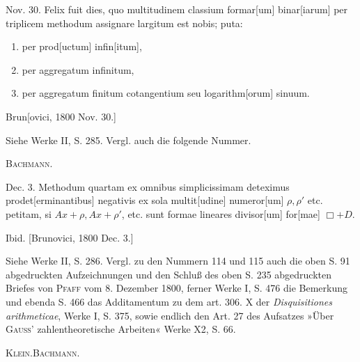 \noindent\hspace*{\parindent}Nov. 30. Felix fuit dies, quo multitudinem classium formar[um] binar[iarum] per triplicem methodum assignare largitum est nobis; puta:
\begin{enumerate}
\item per prod[uctum] infin[itum],
\item per aggregatum infinitum,
\item per aggregatum finitum cotangentium seu logarithm[orum] sinuum.
\end{enumerate}
\par\noindent\hfill Brun[ovici, 1800 Nov. 30.]
\par\medskip\begingroup\small
\noindent\hspace*{\parindent}Siehe Werke II, S. 285. Vergl. auch die folgende Nummer.
\par\noindent\hfill\textsc{Bachmann.}
\par\endgroup

\noindent\hspace*{\parindent}Dec. 3. Methodum quartam ex omnibus simplicissimam deteximus pro\linebreak det[erminantibus] negativis ex sola multit[udine] numeror[um] \(\rho,\rho'\) etc. petitam, si \(Ax+\rho,Ax+\rho'\), etc. sunt formae lineares divisor[um] for[mae] \(\Box+D\).
\par\noindent\hfill Ibid. [Brunovici, 1800 Dec. 3.]
\par\medskip\begingroup\small
\noindent\hspace*{\parindent}Siehe Werke II, S. 286. Vergl. zu den Nummern 114 und 115 auch die oben S. 91 abgedruckten Aufzeichnungen und den Schluß des oben S. 235 abgedruckten Briefes von \textsc{Pfaff} vom 8. Dezember 1800, ferner Werke I, S. 476 die Bemerkung und ebenda S. 466 das Additamentum zu dem art. 306. X der \textit{Disquisitiones arithmeticae}, Werke I, S. 375, sowie endlich den Art. 27 des Aufsatzes »Über \textsc{Gauss}' zahlentheoretische Arbeiten« Werke X2, S. 66.
\par\noindent\hfill\textsc{Klein.\quad Bachmann.}
\par\endgroup

